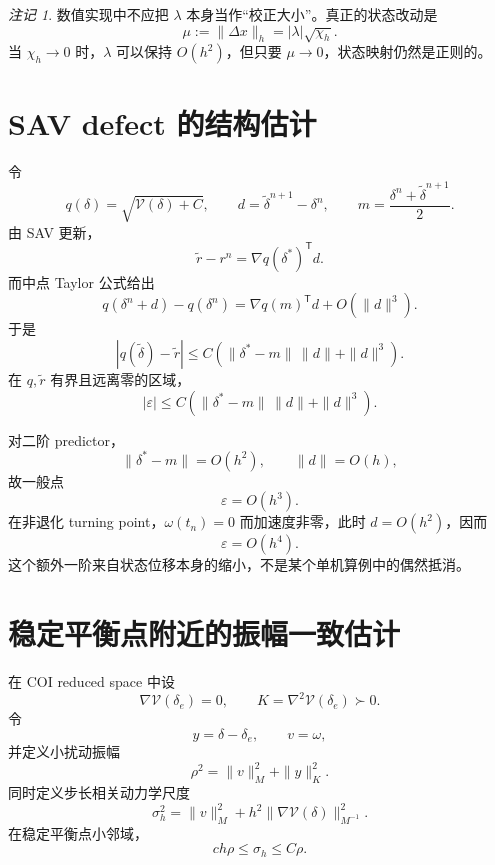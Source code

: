 \documentclass[UTF8,11pt,a4paper]{ctexart}
\theoremstyle{definition}
\theoremstyle{remark}
\newtheorem{remark}[theorem]{注记}
\newcommand{\T}{\mathsf{T}}
\newcommand{\V}{\mathcal V}
\newcommand{\wt}{\widetilde}
\begin{document}
\begin{remark}
数值实现中不应把 \(\lambda\) 本身当作“校正大小”。真正的状态改动是
\[
 \mu:=\|\Delta x\|_h
 =|\lambda|\sqrt{\chi_h}.
\]
当 \(\chi_h\to0\) 时，\(\lambda\) 可以保持 \(O(h^2)\)，但只要
\(\mu\to0\)，状态映射仍然是正则的。
\end{remark}

\section{SAV defect 的结构估计}

令
\[
 q(\delta)=\sqrt{\V(\delta)+C},
 \qquad
 d=\wt\delta^{n+1}-\delta^n,
 \qquad
 m=\frac{\delta^n+\wt\delta^{n+1}}2.
\]
由 SAV 更新，
\[
 \wt r-r^n
 =
 \nabla q(\delta^*)^\T d.
\]
而中点 Taylor 公式给出
\[
 q(\delta^n+d)-q(\delta^n)
 =
 \nabla q(m)^\T d+O(\|d\|^3).
\]
于是
\begin{equation}
 |q(\wt\delta)-\wt r|
 \le
 C\left(
 \|\delta^*-m\|\,\|d\|
 +\|d\|^3
 \right).
 \label{eq:q-defect-bound}
\end{equation}
在 \(q,\wt r\) 有界且远离零的区域，
\begin{equation}
 \boxed{
 |\varepsilon|
 \le
 C\left(
 \|\delta^*-m\|\,\|d\|
 +\|d\|^3
 \right).}
 \label{eq:epsilon-structural}
\end{equation}

对二阶 predictor，
\[
 \|\delta^*-m\|=O(h^2),
 \qquad
 \|d\|=O(h),
\]
故一般点
\begin{equation}
 \varepsilon=O(h^3).
 \label{eq:regular-epsilon}
\end{equation}
在非退化 turning point，\(\omega(t_n)=0\) 而加速度非零，此时
\(
 d=O(h^2)
\)，因而
\begin{equation}
 \boxed{\varepsilon=O(h^4).}
 \label{eq:turning-epsilon}
\end{equation}
这个额外一阶来自状态位移本身的缩小，不是某个单机算例中的偶然抵消。

\section{稳定平衡点附近的振幅一致估计}

在 COI reduced space 中设
\[
 \nabla\V(\delta_e)=0,
 \qquad
 K=\nabla^2\V(\delta_e)\succ0.
\]
令
\[
 y=\delta-\delta_e,\qquad v=\omega,
\]
并定义小扰动振幅
\begin{equation}
 \rho^2=\|v\|_M^2+\|y\|_K^2.
 \label{eq:rho}
\end{equation}
同时定义步长相关动力学尺度
\begin{equation}
 \boxed{
 \sigma_h^2
 =
 \|v\|_M^2
 +
 h^2
 \|\nabla\V(\delta)\|_{M^{-1}}^2.}
 \label{eq:sigma}
\end{equation}
在稳定平衡点小邻域，
\[
 c h\rho\le\sigma_h\le C\rho.
\]
\end{document}
